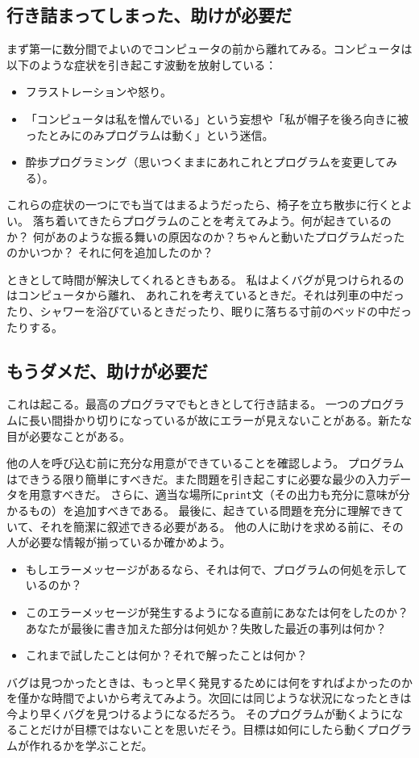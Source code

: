 \documentclass[a4j,12pt,makeidx]{jbook}
\begin{document}
\subsection*{行き詰まってしまった、助けが必要だ}
まず第一に数分間でよいのでコンピュータの前から離れてみる。コンピュータは以下のような症状を引き起こす波動を放射している：
\begin{itemize}
\item フラストレーションや怒り。
\item 「コンピュータは私を憎んでいる」という妄想や「私が帽子を後ろ向きに被ったとみにのみプログラムは動く」という迷信。
\item 酔歩プログラミング（思いつくままにあれこれとプログラムを変更してみる）。
\end{itemize}
これらの症状の一つにでも当てはまるようだったら、椅子を立ち散歩に行くとよい。
落ち着いてきたらプログラムのことを考えてみよう。何が起きているのか？
何があのような振る舞いの原因なのか？ちゃんと動いたプログラムだったのかいつか？
それに何を追加したのか？\par
ときとして時間が解決してくれるときもある。
私はよくバグが見つけられるのはコンピュータから離れ、
あれこれを考えているときだ。それは列車の中だったり、シャワーを浴びているときだったり、眠りに落ちる寸前のベッドの中だったりする。
%
\subsection*{もうダメだ、助けが必要だ}
これは起こる。最高のプログラマでもときとして行き詰まる。
一つのプログラムに長い間掛かり切りになっているが故にエラーが見えないことがある。新たな目が必要なことがある。\par
他の人を呼び込む前に充分な用意ができていることを確認しよう。
プログラムはできうる限り簡単にすべきだ。また問題を引き起こすに必要な最少の入力データを用意すべきだ。
さらに、適当な場所に{\tt print}文（その出力も充分に意味が分かるもの）を追加すべきである。
最後に、起きている問題を充分に理解できていて、それを簡潔に叙述できる必要がある。
他の人に助けを求める前に、その人が必要な情報が揃っているか確かめよう。
\begin{itemize}
\item もしエラーメッセージがあるなら、それは何で、プログラムの何処を示しているのか？
\item このエラーメッセージが発生するようになる直前にあなたは何をしたのか？あなたが最後に書き加えた部分は何処か？失敗した最近の事列は何か？
\item これまで試したことは何か？それで解ったことは何か？
\end{itemize} \par
バグは見つかったときは、もっと早く発見するためには何をすればよかったのかを僅かな時間でよいから考えてみよう。次回には同じような状況になったときは今より早くバグを見つけるようになるだろう。
そのプログラムが動くようになることだけが目標ではないことを思いだそう。目標は如何にしたら動くプログラムが作れるかを学ぶことだ。
%
\end{document}
